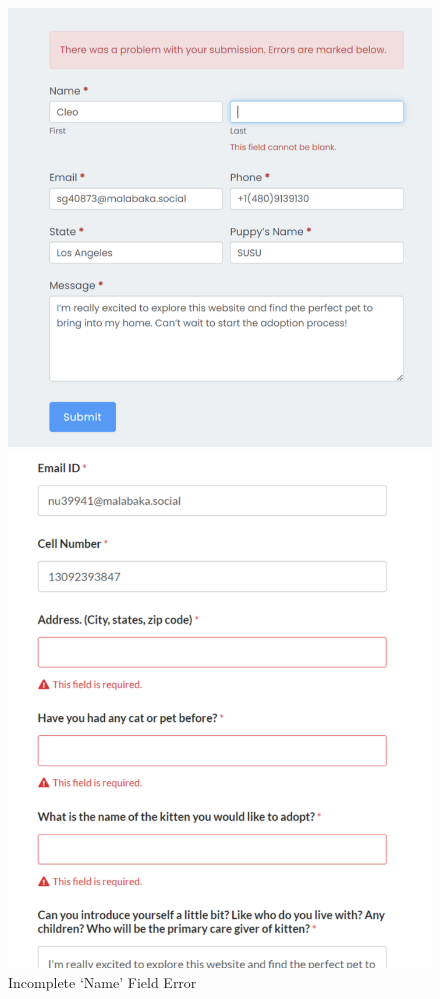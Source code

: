 \documentclass[ oneside,%
                    author={Cassie Qing Tang},
                    degree={BSc},
                     title={An Automated Response System for Disrupting Online Pet Scamming \\ },
                    subtitle={ }]{dissertation}
\begin{document}
\begin{figure}[H]
    \centering
    \begin{minipage}{0.45\textwidth}
        \includegraphics[width=\linewidth]{pic/figure10.png}
        \caption{Incomplete `Name' Field Error}
        \label{fig:pic10}
    \end{minipage}
    \hfill 
    \begin{minipage}{0.45\textwidth}
        \includegraphics[width=\linewidth, height=0.3\textheight]{pic/figure11.png}

\end{minipage}
\end{figure}
\end{document}
